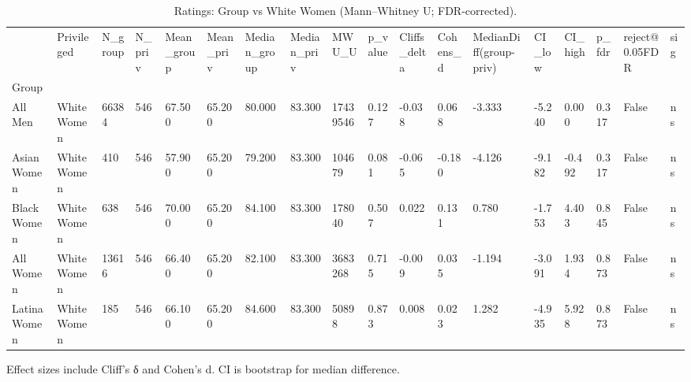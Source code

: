 \begin{table}[htbp]
\centering
\caption{Ratings: Group vs White Women (Mann–Whitney U; FDR-corrected).}
\label{tab:05-bias-ratings}
\begin{tabular}{llllllllllllllllll}
\toprule
 & Privileged & N\_group & N\_priv & Mean\_group & Mean\_priv & Median\_group & Median\_priv & MWU\_U & p\_value & Cliffs\_delta & Cohens\_d & MedianDiff(group-priv) & CI\_low & CI\_high & p\_fdr & reject@0.05FDR & sig \\
Group &  &  &  &  &  &  &  &  &  &  &  &  &  &  &  &  &  \\
\midrule
All Men & White Women & 66384 & 546 & 67.500 & 65.200 & 80.000 & 83.300 & 17439546 & 0.127 & -0.038 & 0.068 & -3.333 & -5.240 & 0.000 & 0.317 & False & ns \\
Asian Women & White Women & 410 & 546 & 57.900 & 65.200 & 79.200 & 83.300 & 104679 & 0.081 & -0.065 & -0.180 & -4.126 & -9.182 & -0.492 & 0.317 & False & ns \\
Black Women & White Women & 638 & 546 & 70.000 & 65.200 & 84.100 & 83.300 & 178040 & 0.507 & 0.022 & 0.131 & 0.780 & -1.753 & 4.403 & 0.845 & False & ns \\
All Women & White Women & 13616 & 546 & 66.400 & 65.200 & 82.100 & 83.300 & 3683268 & 0.715 & -0.009 & 0.035 & -1.194 & -3.091 & 1.934 & 0.873 & False & ns \\
Latina Women & White Women & 185 & 546 & 66.100 & 65.200 & 84.600 & 83.300 & 50898 & 0.873 & 0.008 & 0.023 & 1.282 & -4.935 & 5.928 & 0.873 & False & ns \\
\bottomrule
\end{tabular}

\begin{tablenotes}[flushleft]
\item \small{Effect sizes include Cliff's δ and Cohen's d. CI is bootstrap for median difference.}
\end{tablenotes}
\end{table}